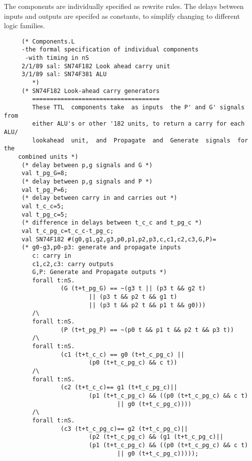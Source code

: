 The components are individually specified as rewrite rules.
The delays between inputs and outputs are specifed as constants, to simplify
changing to different logic families.
\begin{verbatim}
     (* Components.L 
     -the formal specification of individual components
      -with timing in nS
     2/1/89 sal: SN74F182 Look ahead carry unit
     3/1/89 sal: SN74F381 ALU
        *)
     (* SN74F182 Look-ahead carry generators 
        ====================================
        These TTL  components take  as inputs  the P' and G' signals from
        either ALU's or other '182 units, to return a carry for each ALU/
        lookahead  unit,  and  Propagate  and  Generate  signals  for the
	combined units *)
     (* delay between p,g signals and G *)
     val t_pg_G=8;
     (* delay between p,g signals and P *)
     val t_pg_P=6;
     (* delay between carry in and carries out *)
     val t_c_c=5;
     val t_pg_c=5;
     (* difference in delays between t_c_c and t_pg_c *)
     val t_c_pg_c=t_c_c-t_pg_c;
     val SN74F182 #(g0,g1,g2,g3,p0,p1,p2,p3,c,c1,c2,c3,G,P)=
     (* g0-g3,p0-p3: generate and propagate inputs
        c: carry in
        c1,c2,c3: carry outputs
        G,P: Generate and Propagate outputs *)
        forall t:nS.
                (G (t+t_pg_G) == ~(g3 t || (p3 t && g2 t)
                        || (p3 t && p2 t && g1 t)
                        || (p3 t && p2 t && p1 t && g0)))
        /\
        forall t:nS.
                (P (t+t_pg_P) == ~(p0 t && p1 t && p2 t && p3 t))
        /\
        forall t:nS.
                (c1 (t+t_c_c) == g0 (t+t_c_pg_c) ||
                        (p0 (t+t_c_pg_c) && c t))
        /\
        forall t:nS.
                (c2 (t+t_c_c)== g1 (t+t_c_pg_c)||
                        (p1 (t+t_c_pg_c) && ((p0 (t+t_c_pg_c) && c t)
                                || g0 (t+t_c_pg_c))))
        /\
        forall t:nS.
                (c3 (t+t_c_pg_c)== g2 (t+t_c_pg_c)||
                        (p2 (t+t_c_pg_c) && (g1 (t+t_c_pg_c)||
                        (p1 (t+t_c_pg_c) && ((p0 (t+t_c_pg_c) && c t)
                                || g0 (t+t_c_pg_c)))));


\end{verbatim}
